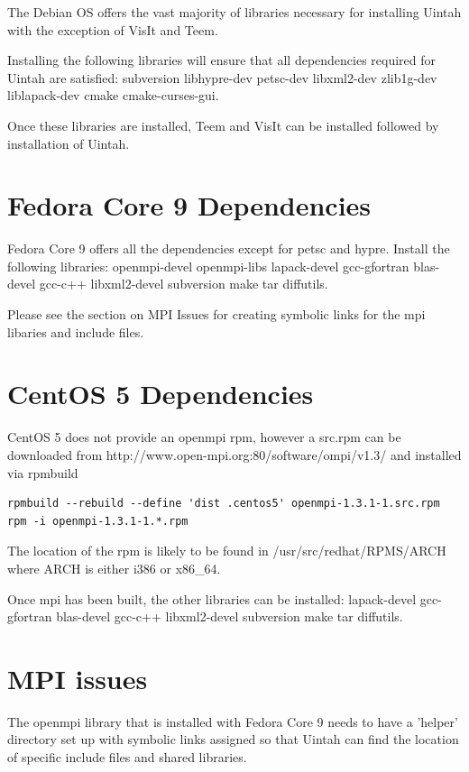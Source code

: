 \documentclass[12pt]{article}
\begin{document}
The Debian OS offers the vast majority of libraries necessary for
installing Uintah with the exception of VisIt and Teem.

Installing the following libraries will ensure that all dependencies
required for Uintah are satisfied: subversion libhypre-dev petsc-dev
libxml2-dev zlib1g-dev liblapack-dev cmake cmake-curses-gui.

Once these libraries are installed, Teem and VisIt can be installed
followed by installation of Uintah.

\section{Fedora Core 9 Dependencies}

Fedora Core 9 offers all the dependencies except for petsc and hypre.
Install the following libraries: openmpi-devel openmpi-libs
lapack-devel gcc-gfortran blas-devel gcc-c++ libxml2-devel subversion
make tar diffutils.  

Please see the section on MPI Issues for creating symbolic links for
the mpi libaries and include files.

\section{CentOS 5 Dependencies}

CentOS 5 does not provide an openmpi rpm, however a src.rpm can be
downloaded from http://www.open-mpi.org:80/software/ompi/v1.3/ and
installed via rpmbuild

\begin{Verbatim}
rpmbuild --rebuild --define 'dist .centos5' openmpi-1.3.1-1.src.rpm
rpm -i openmpi-1.3.1-1.*.rpm
\end{Verbatim}

The location of the rpm is likely to be found in
/usr/src/redhat/RPMS/ARCH where ARCH is either i386 or x86\_64.

Once mpi has been built, the other libraries can be installed:
lapack-devel gcc-gfortran blas-devel gcc-c++ libxml2-devel subversion
make tar diffutils.

\section{MPI issues}

The openmpi library that is installed with Fedora Core 9 needs to have
a 'helper' directory set up with symbolic links assigned so that
Uintah can find the location of specific include files and shared
libraries.
\end{document}
